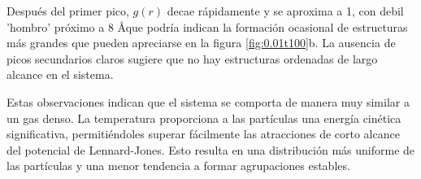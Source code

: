 \vspace{\baselineskip}

Después del primer pico, $g(r)$ decae rápidamente y se aproxima a 1, con debil 'hombro' próximo a 8 \AA que podría indican la formación ocasional de estructuras más grandes que pueden apreciarse en la figura \ref{fig:0.01t100}b. La ausencia de picos secundarios claros sugiere que no hay estructuras ordenadas de largo alcance en el sistema.  

\vspace{\baselineskip}

Estas observaciones indican que el sistema se comporta de manera muy similar a un gas denso. La temperatura proporciona a las partículas una energía cinética significativa, permitiéndoles superar fácilmente las atracciones de corto alcance del potencial de Lennard-Jones. Esto resulta en una distribución más uniforme de las partículas y una menor tendencia a formar agrupaciones estables.



